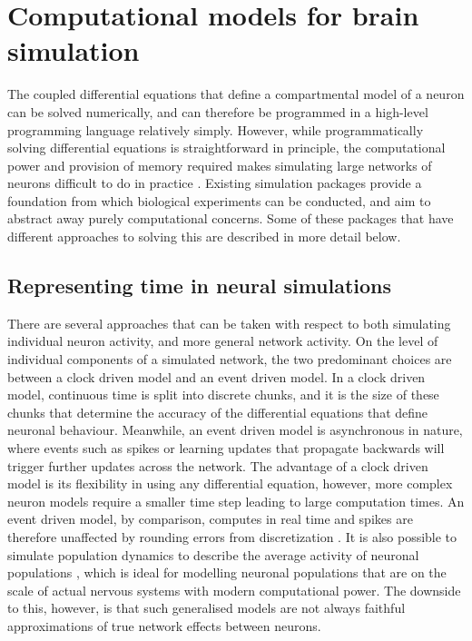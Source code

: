 

\section{Computational models for brain simulation}

The coupled differential equations that define a compartmental model of a neuron
can be solved numerically, and can therefore be programmed in a high-level
programming language relatively simply. However, while programmatically solving
differential equations is straightforward in principle, the computational power
and provision of memory required makes simulating large networks of neurons
difficult to do in practice \autocite{trappenberg_fundamentals_2009}. Existing
simulation packages provide a foundation from which biological experiments can
be conducted, and aim to abstract away purely computational concerns. Some of
these packages that have different approaches to solving this are described in
more detail below.

\subsection{Representing time in neural simulations}

There are several approaches that can be taken with respect to both simulating
individual neuron activity, and more general network activity. On the level of
individual components of a simulated network, the two predominant choices are
between a clock driven model and an event driven model. In a clock driven model,
continuous time is split into discrete chunks, and it is the size of these
chunks that determine the accuracy of the differential equations that define
neuronal behaviour. Meanwhile, an event driven model is asynchronous in nature,
where events such as spikes or learning updates that propagate backwards will
trigger further updates across the network. The advantage of a clock driven
model is its flexibility in using any differential equation, however, more
complex neuron models require a smaller time step leading to large computation
times. An event driven model, by comparison, computes in real time and spikes
are therefore unaffected by rounding errors from discretization
\autocite{brette_simulation_2007}. It is also possible to simulate population
dynamics to describe the average activity of neuronal populations
\autocite{trappenberg_fundamentals_2009}, which is ideal for modelling neuronal
populations that are on the scale of actual nervous systems with modern
computational power. The downside to this, however, is that such generalised
models are not always faithful approximations of true network effects between
neurons.

